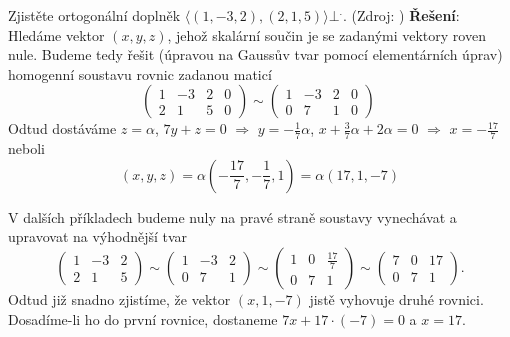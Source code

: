 
\begin{example}\label{mai:exam011}
  Zjistěte ortogonální doplněk \(\langle(1,-3,2),(2,1,5)\rangle\bot^.\). (Zdroj:
  \cite[s.~3]{MosnaMA3})
  \newline\textbf{Řešení}:
  Hledáme vektor \((x, y, z)\), jehož skalární součin je se zadanými vektory roven nule. Budeme 
  tedy řešit (úpravou na Gaussův tvar pomocí elementárních úprav) homogenní soustavu rovnic
  zadanou maticí
  \begin{equation*}
     \left(
       \begin{array}{ccc|c}
          1  &  -3  & 2 & 0 \\
          2  &   1  & 5 & 0
       \end{array}
     \right)\sim
     \left(
       \begin{array}{ccc|c}
          1  &  -3  & 2 & 0 \\
          0  &   7  & 1 & 0
       \end{array}
     \right)\
  \end{equation*}
  Odtud dostáváme \(z = \alpha\), \(7y + z = 0\) \(\Rightarrow\) \(y = -\frac{1}{7}\alpha\), \(x
  +\frac{3}{7}\alpha + 2\alpha = 0\) \(\Rightarrow\) \(x = -\frac{17}{7}\) neboli 
  \begin{equation*}
  (x, y, z) =\alpha\left(-\frac{17}{7}, -\frac{1}{7}, 1\right) = \alpha(17, 1, -7)
  \end{equation*}

  V dalších příkladech budeme nuly na pravé straně soustavy vynechávat a upravovat na
  výhodnější tvar
  \begin{equation*}
       \begin{pmatrix}
          1  &  -3  & 2  \\
          2  &   1  & 5
       \end{pmatrix}
       \sim
       \begin{pmatrix}
          1  &  -3  & 2 \\
          0  &   7  & 1
       \end{pmatrix}
       \sim
       \begin{pmatrix}
          1  &   0  & \frac{17}{7}  \\
          0  &   7  & 1
       \end{pmatrix}
       \sim
       \begin{pmatrix}
          7  &   0  & 17 \\
          0  &   7  & 1
       \end{pmatrix}.
  \end{equation*}
  Odtud již snadno zjistíme, že vektor \((x, 1, -7)\) jistě vyhovuje druhé rovnici. Dosadíme-li ho 
  do první rovnice, dostaneme \(7x + 17\cdot(-7) = 0\) a \(x = 17\).


\end{example}
